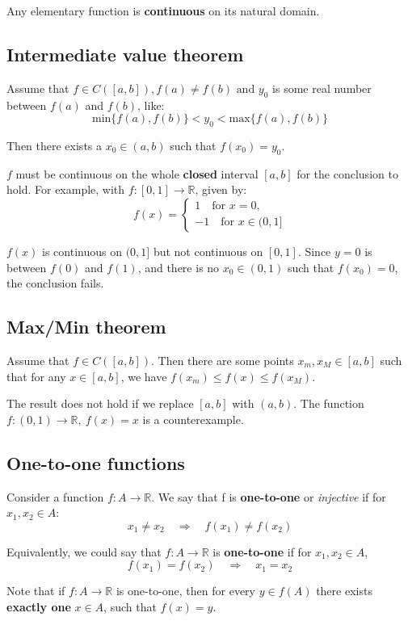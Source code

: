 \documentclass[11pt]{article}
\begin{document}
Any elementary function is \textbf{continuous} on its natural domain.
\subsection{Intermediate value theorem}
\label{sec:orgfaf863a}
Assume that \(f \in C([a, b]), f(a) \neq f(b) \text{ and } y_0\) is some real number between \(f(a)\) and \(f(b)\), like:
\[\text{min}\{f(a), f(b)\} < y_0 < \text{max}\{f(a), f(b)\}\]

Then there exists a \(x_0 \in (a, b)\) such that \(f(x_0) = y_0\).


\(f\) must be continuous on the whole \textbf{closed} interval \([a, b]\) for the conclusion to hold. For example, with \(f : [0, 1] \rightarrow \mathbb{R}\), given by:
\[
f(x) = \begin{cases}
1 \quad \text{for } x = 0, \\
-1 \quad \text{for } x \in (0, 1]
\end{cases}
\]

\(f(x)\) is continuous on \((0, 1]\) but not continuous on \([0, 1]\). Since \(y = 0\) is between \(f(0)\) and \(f(1)\), and there is no \(x_0 \in (0, 1)\) such that \(f(x_0) = 0\), the conclusion fails.
\subsection{Max/Min theorem}
\label{sec:org4773dfb}
Assume that \(f \in C([a, b])\). Then there are some points \(x_m, x_M \in [a, b]\) such that for any \(x \in [a, b]\), we have \(f(x_m) \le f(x) \le f(x_M)\).


The result does not hold if we replace \([a, b]\) with \((a, b)\). The function \(f : (0, 1) \rightarrow \mathbb{R}, \ f(x) = x\) is a counterexample.
\subsection{One-to-one functions}
\label{sec:org8157e18}
Consider a function \(f : A \rightarrow \mathbb{R}\). We say that f is \textbf{one-to-one} or \emph{injective} if for \(x_1, x_2 \in A\):
\[x_1 \neq x_2 \quad \Rightarrow \quad f(x_1) \neq f(x_2)\]

Equivalently, we could say that \(f : A \rightarrow \mathbb{R}\) is \textbf{one-to-one} if for \(x_1, x_2 \in A\),
\[f(x_1) = f(x_2) \quad \Rightarrow \quad x_1 = x_2\]

Note that if \(f : A \rightarrow \mathbb{R}\) is one-to-one, then for every \(y \in f(A)\) there exists \textbf{exactly one} \(x \in A\), such that \(f(x) = y\).
\end{document}
